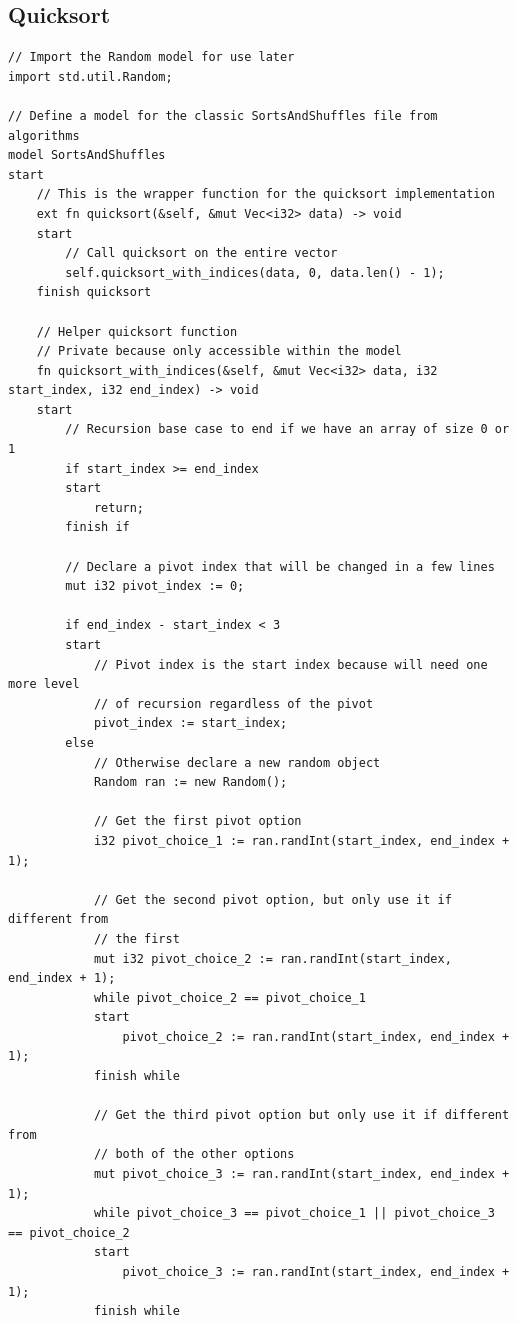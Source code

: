 \documentclass[letterpaper, 10pt, DIV=13]{scrartcl}
\numberwithin{equation}{section}
\numberwithin{figure}{section}
\numberwithin{table}{section}
\begin{document}
\subsection{Quicksort}
\begin{lstlisting}[caption = SortsAndShuffles.rez, frame = single, nolol]
// Import the Random model for use later
import std.util.Random;

// Define a model for the classic SortsAndShuffles file from algorithms
model SortsAndShuffles
start
    // This is the wrapper function for the quicksort implementation
    ext fn quicksort(&self, &mut Vec<i32> data) -> void
    start
        // Call quicksort on the entire vector
        self.quicksort_with_indices(data, 0, data.len() - 1);
    finish quicksort

    // Helper quicksort function
    // Private because only accessible within the model
    fn quicksort_with_indices(&self, &mut Vec<i32> data, i32 start_index, i32 end_index) -> void
    start
        // Recursion base case to end if we have an array of size 0 or 1
        if start_index >= end_index
        start
            return;
        finish if

        // Declare a pivot index that will be changed in a few lines
        mut i32 pivot_index := 0;

        if end_index - start_index < 3
        start
            // Pivot index is the start index because will need one more level
            // of recursion regardless of the pivot
            pivot_index := start_index;
        else
            // Otherwise declare a new random object
            Random ran := new Random();

            // Get the first pivot option
            i32 pivot_choice_1 := ran.randInt(start_index, end_index + 1);

            // Get the second pivot option, but only use it if different from
            // the first
            mut i32 pivot_choice_2 := ran.randInt(start_index, end_index + 1);
            while pivot_choice_2 == pivot_choice_1
            start
                pivot_choice_2 := ran.randInt(start_index, end_index + 1);
            finish while

            // Get the third pivot option but only use it if different from
            // both of the other options
            mut pivot_choice_3 := ran.randInt(start_index, end_index + 1);
            while pivot_choice_3 == pivot_choice_1 || pivot_choice_3 == pivot_choice_2
            start
                pivot_choice_3 := ran.randInt(start_index, end_index + 1);
            finish while


\end{lstlisting}
\end{document}
